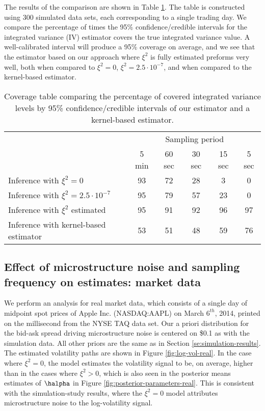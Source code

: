 The results of the comparison are shown in Table \ref{ta:coverage}. The table is constructed using 300 simulated data sets, each corresponding to a single trading day. We compare the percentage of times the 95\% confidence/credible intervals for the integrated variance (IV) estimator covers the true integrated variance value.  A well-calibrated interval will produce a 95\% coverage on average, and we see that the estimator based on our approach where $\xi^2$ is fully estimated preforms very well, both when compared to $\xi^2 =0$, $\xi^2 = 2.5 \cdot 10^{-7}$, and when compared to the kernel-based estimator.

\begin{table}[h]
\begin{center}
  \begin{tabular}{|l|ccccc|}
    \hline
    & \multicolumn{5}{c|}{Sampling period} \\
    &   5 min  &	60 sec 	&   30 sec   &   15 sec & 5 sec  \\ \hline \hline
    Inference with $\xi^2 = 0$  &  93  &  72  &   28  &	 3 & 0 \\
    Inference with $\xi^2 = 2.5 \cdot 10^{-7}$ & 95 & 79 & 57 & 23 & 0 \\
    Inference with $\xi^2$ estimated & 95 & 91 & 92 & 96 & 97  \\ \hline
    Inference with kernel-based estimator &  53 & 51 & 48 & 59  & 76 \\
    \hline
\end{tabular}
\caption{Coverage table comparing the percentage of covered integrated variance levels by 95\% confidence/credible intervals of our estimator and a kernel-based estimator.}\label{ta:coverage}
\end{center}
\end{table}

\subsection{ Effect of microstructure noise and sampling frequency on estimates: market data }

We perform an analysis for real market data, which consists of a single day of midpoint spot prices of Apple Inc. (NASDAQ:AAPL) on March $6^{th}$, 2014, printed on the millisecond from the NYSE TAQ data set.  Our a priori distribution for the bid-ask spread driving microstructure noise is centered on \$0.1 as with the simulation data. All other priors are the same as in Section \ref{se:simulation-results}.  The estimated volatility paths are shown in Figure \ref{fig:log-vol-real}.  In the case where $\xi^2 = 0$, the model estimates the volatility signal to be, on average, higher than in the cases where $\xi^2 > 0$, which is also seen in the posterior means estimates of $\halpha$ in Figure \ref{fig:posterior-parameters-real}. This is consistent with the simulation-study results, where the $\xi^2 = 0$ model attributes microstructure noise to the log-volatility signal.

